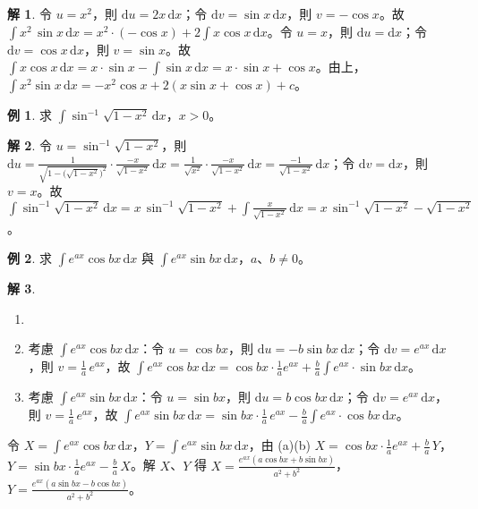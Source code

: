 \documentclass[12pt]{extarticle}
\newcommand{\ds}{\displaystyle}
\theoremstyle{definition}
\newtheorem*{ex}{例}
\newtheorem*{sol}{解}
\begin{document}
\begin{sol}
  令 $\ds u = x^2$，則 $\ds\mathrm{d}u = 2x\,\mathrm{d}x$；令 $\ds\mathrm{d}v = \sin x\,\mathrm{d}x$，則 $\ds v = -\cos x$。故 $\ds\int\!x^2\,\sin x\,\mathrm{d}x = x^2\cdot(-\cos x) + 2 \int\!x \cos x\,\mathrm{d}x$。令 $\ds u = x$，則 $\ds\mathrm{d}u = \mathrm{d}x$；令 $\ds\mathrm{d}v = \cos x\,\mathrm{d}x$，則 $\ds v = \sin x$。故 $\ds\int\!x \cos x\,\mathrm{d}x = x\cdot\sin x - \int\!\sin x\,\mathrm{d}x = x\cdot\sin x + \cos x$。由上，$\ds\int\!x^2\sin x\,\mathrm{d}x = -x^2\cos x + 2 (x\sin x + \cos x) + c$。
\end{sol}
    
\begin{ex}
  求 $\ds\int\!\sin^{-1}\sqrt{1 - x^2}\,\mathrm{d}x$，$x > 0$。
\end{ex}

\begin{sol}
  令 $\ds u = \sin^{-1}\sqrt{1 - x^2}$，則 $\ds\mathrm{d}u = \frac{1}{\sqrt{1 - \big(\sqrt{1 - x^2}\big)^2}}\cdot\frac{-x}{\sqrt{1 - x^2}}\,\mathrm{d}x = \frac{1}{\sqrt{x^2}}\cdot\frac{-x}{\sqrt{1 - x^2}}\,\mathrm{d}x = \frac{-1}{\sqrt{1 - x^2}}\,\mathrm{d}x$；令 $\ds\mathrm{d}v = \mathrm{d}x$，則 $\ds v = x$。故 $\ds\int\!\sin^{-1}\sqrt{1 - x^2}\,\mathrm{d}x = x\,\sin^{-1}\sqrt{1 - x^2} + \int\!\frac{x}{\sqrt{1 - x^2}}\,\mathrm{d}x = x\,\sin^{-1}\sqrt{1 - x^2} - \sqrt{1 - x^2}$。
\end{sol}

\begin{ex}
  求 $\ds\int\!e^{ax}\cos bx\,\mathrm{d}x$ 與 $\ds\int\!e^{ax}\sin bx\,\mathrm{d}x$，$a$、$b\ne 0$。
\end{ex}

\begin{sol}
  \begin{enumerate}[label=(\alph*)]\setlength{\itemsep}{0pt}
    \item[]
    \item 考慮 $\ds\int\!e^{ax}\cos bx\,\mathrm{d}x$：令 $\ds u = \cos bx$，則 $\ds\mathrm{d}u = -b\sin bx\,\mathrm{d}x$；令 $\ds\mathrm{d}v = e^{ax}\,\mathrm{d}x$，則 $\ds v = \frac{1}{a}\,e^{ax}$，故 $\ds\int\!e^{ax}\cos bx\,\mathrm{d}x = \cos bx\cdot \frac{1}{a}e^{ax} + \frac{b}{a}\int\!e^{ax}\cdot\sin bx\,\mathrm{d}x$。
    \item 考慮 $\ds\int\!e^{ax}\sin bx\,\mathrm{d}x$：令 $\ds u = \sin bx$，則 $\ds\mathrm{d}u = b\cos bx\,\mathrm{d}x$；令 $\ds\mathrm{d}v = e^{ax}\,\mathrm{d}x$，則 $\ds v = \frac{1}{a}\,e^{ax}$，故 $\ds\int\!e^{ax}\sin bx\,\mathrm{d}x = \sin bx\cdot \frac{1}{a}\,e^{ax} - \frac{b}{a}\int\!e^{ax}\cdot\cos bx\,\mathrm{d}x$。
  \end{enumerate}
  \noindent 令 $\ds X = \int\!e^{ax}\cos bx\,\mathrm{d}x$，$\ds Y = \int\!e^{ax}\sin bx\,\mathrm{d}x$，由 (a)(b) $\ds X = \cos bx\cdot\frac{1}{a}e^{ax} + \frac{b}{a}\,Y$，$\ds Y = \sin bx\cdot\frac{1}{a}e^{ax} - \frac{b}{a}\,X$。解 $X$、$Y$ 得 $\ds X = \frac{e^{ax}(a\cos bx + b\sin bx)}{a^2 + b^2}$，$\ds Y = \frac{e^{ax}(a\sin bx - b\cos bx)}{a^2 + b^2}$。
\end{sol}
\end{document}
